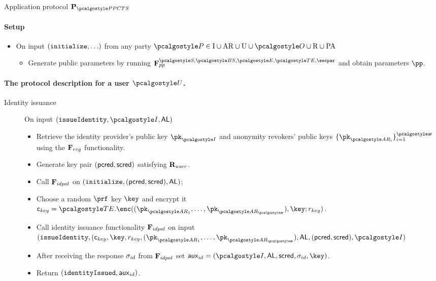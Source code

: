\documentclass[runningheads,10pt]{llncs}
\numberwithin{equation}{section}
\begin{document}
\begin{protbox}{Application protocol $\prot{\PPCTS}$}
  \paragraph{Setup}
  \begin{itemize}
  \item On input $(\mathtt{initialize}, \ldots)$ from any party $\party \in \partyset{I} \cup
   \partyset{AR} \cup \partyset{U} \cup \owner \cup \partyset{R} \cup \partyset{PA}$
    \begin{itemize}
    \item Generate public parameters by running $\func{pp}^{\SIG, \BSIG, \ENC, \TENC, \secpar}$
      and obtain parameters $\pp$.
    \end{itemize}
  \end{itemize}

  \paragraph{The protocol description for a user $\user$.}
  \begin{description}
    
  \item[Identity issuance] On input $(\issueIdentity, \idprov, \AL)$
    \begin{itemize}
    \item Retrieve the identity provider's public key $\pk_{\idprov}$ and anonymity
      revokers' public keys $\smallset{\pk_{\ar_i}}_{i = 1}^{\noofar}$ using the
      $\mathbf{F}_{{reg}}$ functionality.
    \item Generate key pair $(\mathsf{pcred}, \mathsf{scred})$ satisfying $\mathbf{R}_{user}$.
    \item Call $\mathbf{F}_{{idpol}}$ on $(\mathtt{initialize}, (\mathsf{pcred}, \mathsf{scred}), \mathsf{AL})$;
    \item Choose a random $\prf$ key $\key$ and encrypt it $\ckey =
      \TENC.\enc((\pk_{\ar_1}, \ldots, \pk_{\ar_\noofar}), \key; r_{key})$.
    \item Call identity issuance functionality $\mathbf{F}_{{idpol}}$ on input
      $(\issueIdentity, (\ckey, \key, r_{key}, (\pk_{\ar_1}, \ldots,
      \pk_{\ar_{\noofar}}), \allowbreak \AL, (\pcred, \scred), \idprov)$
    \item After receiving the response $\sigma_{id}$ from $\mathbf{F}_{{idpol}}$ set
      $\auxid = (\idprov, \AL, \scred, \signature_{id}, \key)$.
    \item Return $(\mathtt{identityIssued}, \mathsf{aux}_{id})$.
    \end{itemize}


\end{description}
\end{protbox}
\end{document}
